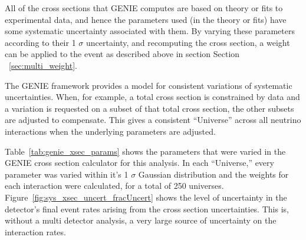 All of the cross sections that GENIE computes are based on theory or fits to experimental data, and hence the parameters used (in the theory or fits) have some systematic uncertainty associated with them.  By varying these parameters according to their 1 $\sigma$ uncertainty, and recomputing the cross section, a weight can be applied to the event as described above in section Section ~\ref{sec:multi_weight}.

The GENIE framework provides a model for consistent variations of systematic uncertainties.  When, for example, a total cross section is constrained by data and a variation is requested on a subset of that total cross section, the other subsets are adjusted to compensate.  This gives a consistent ``Universe'' across all neutrino interactions when the underlying parameters are adjusted.

Table~\ref{tab:genie_xsec_params} shows the parameters that were varied in the GENIE cross section calculator for this analysis.  In each ``Universe,'' every parameter was varied within it's 1 $\sigma$ Gaussian distribution and the weights for each interaction were calculated, for a total of 250 universes.  Figure~\ref{fig:sys_xsec_uncert_fracUncert} shows the level of uncertainty in the detector's final \nue event rates arising from the cross section uncertainties.  This is, without a multi detector analysis, a very large source of uncertainty on the interaction rates.

